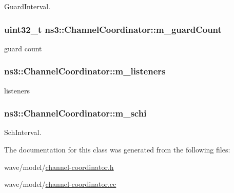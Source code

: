 Guard\+Interval. 

\subsubsection[{\texorpdfstring{m\+\_\+guard\+Count}{m_guardCount}}]{\setlength{\rightskip}{0pt plus 5cm}uint32\+\_\+t ns3\+::\+Channel\+Coordinator\+::m\+\_\+guard\+Count\hspace{0.3cm}{\ttfamily [private]}}\hypertarget{classns3_1_1ChannelCoordinator_a7ceaae0946f96cc409c7181ba419d92c}{}\label{classns3_1_1ChannelCoordinator_a7ceaae0946f96cc409c7181ba419d92c}


guard count 

\subsubsection[{\texorpdfstring{m\+\_\+listeners}{m_listeners}}]{ ns3\+::\+Channel\+Coordinator\+::m\+\_\+listeners\hspace{0.3cm}{\ttfamily [private]}}\hypertarget{classns3_1_1ChannelCoordinator_a4a73ebe8043af381efc90394ba538aac}{}\label{classns3_1_1ChannelCoordinator_a4a73ebe8043af381efc90394ba538aac}


listeners 

\subsubsection[{\texorpdfstring{m\+\_\+schi}{m_schi}}]{ ns3\+::\+Channel\+Coordinator\+::m\+\_\+schi\hspace{0.3cm}{\ttfamily [private]}}\hypertarget{classns3_1_1ChannelCoordinator_af3cec32294e69ebf22a5dfc92d03ad48}{}\label{classns3_1_1ChannelCoordinator_af3cec32294e69ebf22a5dfc92d03ad48}


Sch\+Interval. 



The documentation for this class was generated from the following files\+:\begin{DoxyCompactItemize}
\item 
wave/model/\hyperlink{channel-coordinator_8h}{channel-\/coordinator.\+h}\item 
wave/model/\hyperlink{channel-coordinator_8cc}{channel-\/coordinator.\+cc}\end{DoxyCompactItemize}
